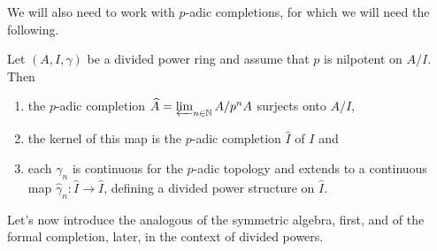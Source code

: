 \noindent
We will also need to work with $p$-adic completions, 
for which we will need the following.
\begin{lem}
	\label{PDExtendCompletion}
	Let $\left(A, I, \gamma\right)$ be a divided power ring and assume
	that $p$ is nilpotent on $A/I$.
	Then
\begin{enumerate}
	\item the $p$-adic completion $\widehat{A} = \varprojlim_{n \in \mathbb{N}}
		A/p^nA$ surjects onto $A/I$,
	\item the kernel of this map is the $p$-adic completion $\widehat{I}$
		of $I$ and
	\item each $\gamma_n$ is continuous for the $p$-adic topology and extends
		to a continuous map $\widehat{\gamma}_n\colon \widehat{I} \to \widehat{I}$,
		defining a divided power structure on $\widehat{I}$.
\end{enumerate}
\end{lem} 


\noindent
Let's now introduce the analogous of the symmetric algebra, first,
and of the formal completion, later,
in the context of divided powers.


